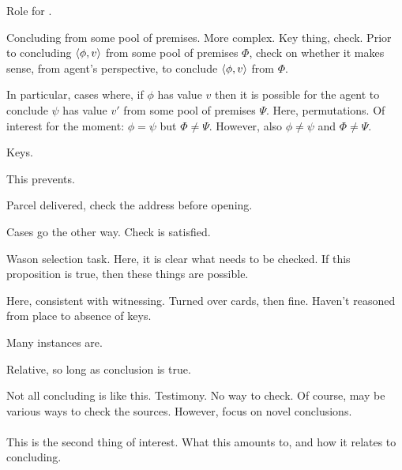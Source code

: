 \begin{note}
  Role for .

  Concluding from some pool of premises.
  More complex.
  Key thing, check.
  Prior to concluding \(\langle \phi, v \rangle\) from some pool of premises \(\Phi\), check on whether it makes sense, from agent's perspective, to conclude \(\langle \phi, v \rangle\) from \(\Phi\).

  In particular, cases where, if \(\phi\) has value \(v\) then it is possible for the agent to conclude \(\psi\) has value \(v'\) from some pool of premises \(\Psi\).
  Here, permutations.
  Of interest for the moment:
  \(\phi = \psi\) but \(\Phi \ne \Psi\).
  However, also \(\phi \ne \psi\) and \(\Phi \ne \Psi\).

  Keys.

  This prevents.

  Parcel delivered, check the address before opening.

  Cases go the other way.
  Check is satisfied.

  Wason selection task.
  Here, it is clear what needs to be checked.
  If this proposition is true, then these things are possible.

  Here, consistent with witnessing.
  Turned over cards, then fine.
  Haven't reasoned from place to absence of keys.

  Many instances are.

  Relative, so long as conclusion is true.
\end{note}

\begin{note}
  Not all concluding is like this.
  Testimony.
  No way to check.
  Of course, may be various ways to check the sources.
  However, focus on novel conclusions.
\end{note}

\paragraph*{\zS{}}

\begin{note}
  This is the second thing of interest.
  What this amounts to, and how it relates to concluding.
\end{note}

